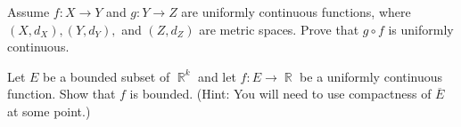 \documentclass[12pt,letterpaper,boxed]{hmcpset}
\DeclareMathOperator{\R}{\mathbb{R}}
\begin{document}
\begin{problem}[Exercise 2.36]
Assume $f: X \rightarrow Y$ and $g: Y \rightarrow Z$ are uniformly continuous functions, where $(X, d_X), (Y, d_Y),$ and $(Z, d_Z)$ are metric spaces. Prove that $g \circ f$ is uniformly continuous.
\end{problem}

\begin{solution}

\end{solution}


\begin{problem}[Exercise 2.37]
Let $E$ be a bounded subset of $\R^{k}$ and let $f : E \rightarrow \R$ be a uniformly continuous function. Show that $f$ is bounded. (Hint: You will need to use compactness of $\overline{E}$ at some point.)
\end{problem}

\begin{solution}

\end{solution}
\end{document}
